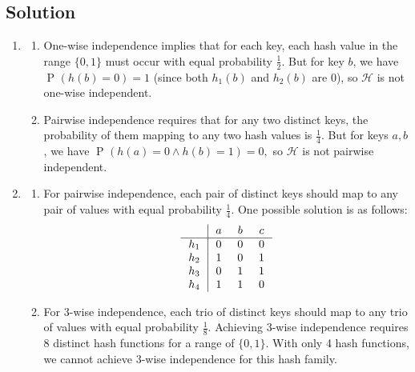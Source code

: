 \documentclass[14pt]{extreport}
\renewcommand{\Pr}[2][]{\operatorname{P}_{#1}\left(#2\right)}
\begin{document}
\subsection*{Solution}
    \begin{enumerate}
        \item 
        \begin{enumerate}[label=\roman*.]
            \item One-wise independence implies that for each key, each hash value in the range $ \{0, 1\} $ must occur with equal probability $ \frac{1}{2} $. But for key $b$, we have $ \Pr{h(b) = 0} = 1 $ (since both $ h_1(b) $ and $ h_2(b) $ are $ 0 $), so $\mathcal{H}$ is not one-wise independent.
            \item Pairwise independence requires that for any two distinct keys, the probability of them mapping to any two hash values is $\frac{1}{4}$. But for keys $ a, b $, we have $\Pr{h(a) = 0 \land h(b) = 1} = 0,$ so $\mathcal{H}$ is not pairwise independent.
        \end{enumerate}
        \item 
        \begin{enumerate}[label=\roman*.]
            \item For pairwise independence, each pair of distinct keys should map to any pair of values with equal probability $ \frac{1}{4} $. One possible solution is as follows:
            \[\arraycolsep=7pt
            \begin{array}{c|ccc}
                & a & b & c \\
                \hline
                h_1 & 0 & 0 & 0 \\
                h_2 & 1 & 0 & 1 \\
                h_3 & 0 & 1 & 1 \\
                h_4 & 1 & 1 & 0 \\
            \end{array}
            \]
            \item For 3-wise independence, each trio of distinct keys should map to any trio of values with equal probability $ \frac{1}{8} $. Achieving 3-wise independence requires 8 distinct hash functions for a range of $ \{0, 1\} $. With only 4 hash functions, we cannot achieve 3-wise independence for this hash family.
        \end{enumerate}
    
    \end{enumerate}
\end{document}
